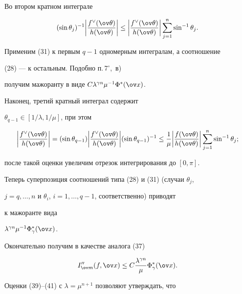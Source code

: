 Во втором кратном интеграле 


$$ 


(\sin\theta_j)^{-1} 


\bigg|\frac{f^\vee(\ov\theta)}{h(\ov\theta)}\bigg|\le 


\bigg|\frac{f^\vee(\ov\theta)}{h(\ov\theta)}\bigg| 


\sum^n_{j=1}\sin^{-1}\theta_j. 


$$ 


Применим (31) к первым $q-1$ одномерным интегралам, а соотношение 


(28) --- к остальным. Подобно п.\,7${}^\circ$,~в) 


получим мажоранту в виде $C\lambda^{\gamma n}\mu^{-1}\Phi^*(\ov x)$. 


Наконец, третий кратный интеграл содержит 


$\theta_{q-1}\in[1/\lambda,1/\mu]$, при этом 


$$ 


\bigg|\frac{f^\vee(\ov\theta)}{h(\ov\theta)}\bigg|= 


(\sin\theta_{q-1}) 


\bigg|\frac{f^\vee(\ov\theta)}{h(\ov\theta)}\bigg| 


(\sin\theta_{q-1})^{-1}\le\frac{1}{\mu} 


\bigg|\frac{f(\ov\theta)}{h(\ov\theta)}\bigg| 


\sum^n_{j=1}\sin^{-1}\theta_j; 


$$ 


после такой оценки увеличим отрезок интегрирования до $[0,\pi]$. 


Теперь суперпозиция соотношений типа (28) и (31) (случаи $\theta_j$, 


$j=q,\dotsc,n$ и $\theta_i$, $i=1,\dotsc,q-1$, соответственно) приводят 


к мажоранте вида 


$\lambda^{\gamma n}\mu^{-1}\Phi^*_\gamma(\ov x)$. 


Окончательно получим в качестве аналога (37) 


\begin{equation} 


I''_{\ov m}(f,\ov x)\le C 


\frac{\lambda^{\gamma n}}{\mu}\Phi^*_\gamma(\ov x).


\end{equation} 


Оценки (39)--(41) с $\lambda=\mu^{n+1}$ позволяют утверждать, что 


